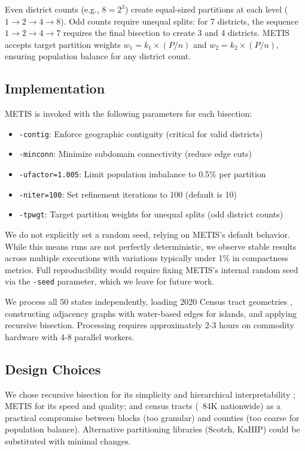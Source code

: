 Even district counts (e.g., $8 = 2^3$) create equal-sized partitions at each level ($1 \to 2 \to 4 \to 8$). Odd counts require unequal splits: for 7 districts, the sequence $1 \to 2 \to 4 \to 7$ requires the final bisection to create 3 and 4 districts. METIS accepts target partition weights $w_1 = k_1 \times (P/n)$ and $w_2 = k_2 \times (P/n)$, ensuring population balance for any district count.

\subsection{Implementation}

METIS is invoked with the following parameters for each bisection:
\begin{itemize}
    \item \texttt{-contig}: Enforce geographic contiguity (critical for valid districts)
    \item \texttt{-minconn}: Minimize subdomain connectivity (reduce edge cuts)
    \item \texttt{-ufactor=1.005}: Limit population imbalance to 0.5\% per partition
    \item \texttt{-niter=100}: Set refinement iterations to 100 (default is 10)
    \item \texttt{-tpwgt}: Target partition weights for unequal splits (odd district counts)
\end{itemize}

We do not explicitly set a random seed, relying on METIS's default behavior. While this means runs are not perfectly deterministic, we observe stable results across multiple executions with variations typically under 1\% in compactness metrics. Full reproducibility would require fixing METIS's internal random seed via the \texttt{-seed} parameter, which we leave for future work.

We process all 50 states independently, loading 2020 Census tract geometries \cite{census2020redistricting}, constructing adjacency graphs with water-based edges for islands, and applying recursive bisection. Processing requires approximately 2-3 hours on commodity hardware with 4-8 parallel workers.

\subsection{Design Choices}

We chose recursive bisection for its simplicity and hierarchical interpretability \cite{hess1965nonpartisan}; METIS for its speed and quality; and census tracts (~84K nationwide) as a practical compromise between blocks (too granular) and counties (too coarse for population balance). Alternative partitioning libraries (Scotch, KaHIP) could be substituted with minimal changes.
